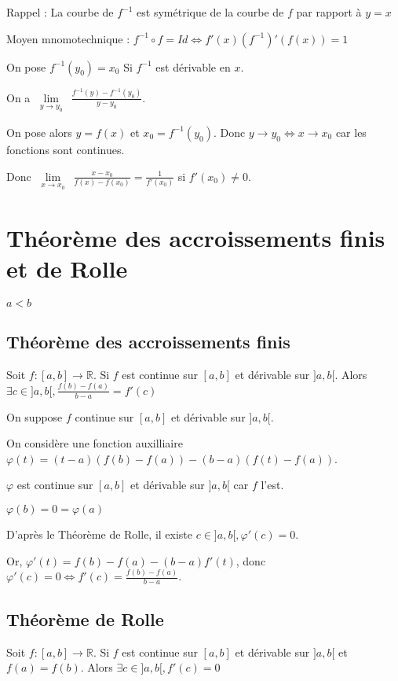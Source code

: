 \documentclass[french]{yLectureNote}
\newcommand{\Lim}[1]{\lim\limits_{\substack{#1}}\:}
\begin{document}
Rappel : La courbe de $f^{-1}$ est symétrique de la courbe de $f$ par rapport à $y=x$

Moyen mnomotechnique : $f^{-1}\circ f = Id \iff f'(x)(f^{-1})'(f(x)) = 1$
\begin{myproof}
On pose $f^{-1}(y_0) = x_0$ Si $f^{-1}$ est dérivable en $x$.

On a $\Lim{y\to y_0}\frac{f^{-1}(y)-f^{-1}(y_0)}{y-y_0}$.

On pose alors $ y = f(x)$ et $x_0 = f^{-1}(y_0)$. Donc $y\to y_0 \iff x\to x_0$ car les fonctions sont continues.

Donc $\Lim{x\to x_0} \frac{x-x_0}{f(x)-f(x_0)} = \frac{1}{f'(x_0)}$ si $f'(x_0)\neq 0$.
\end{myproof}
\section{Théorème des accroissements finis et de Rolle}
$a<b$
\subsection{Théorème des accroissements finis}
\begin{theorem}[]
Soit $f:[a,b]\to \mathbb{R}$. Si $f$ est continue sur $[a,b]$ et dérivable sur $]a,b[$. Alors $\exists c\in]a,b[, \frac{f(b)-f(a)}{b-a} = f'(c)$
\end{theorem}

\begin{myproof}
On suppose $f$ continue sur $[a,b]$ et dérivable sur $]a,b[$.

On considère une fonction auxilliaire $\varphi(t) = (t-a)(f(b)-f(a)) - (b-a)(f(t)-f(a))$.

$\varphi$ est continue sur $[a,b]$ et dérivable sur $]a,b[$ car $f$ l'est.

$\varphi(b) = 0 = \varphi(a)$

D'après le Théorème de Rolle, il existe $c\in]a,b[, \varphi'(c) = 0$.

Or, $\varphi'(t) = f(b)-f(a) - (b-a)f'(t)$, donc $\varphi'(c) = 0 \iff f'(c) = \frac{f(b)-f(a)}{b-a}$.
\end{myproof}
\subsection{Théorème de Rolle}
\begin{theorem}[]
Soit $f:[a,b]\to \mathbb{R}$. Si $f$ est continue sur $[a,b]$ et dérivable sur $]a,b[$ et $f(a) = f(b)$. Alors $\exists c\in]a,b[, f'(c) = 0$
\end{theorem}
\end{document}
